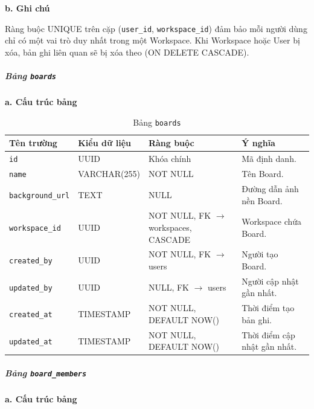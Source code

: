 \hspace{1.5em}\textbf{b. Ghi chú}

Ràng buộc UNIQUE trên cặp (\texttt{user\_id}, \texttt{workspace\_id}) đảm bảo mỗi người dùng chỉ có một vai trò duy nhất trong một Workspace. Khi Workspace hoặc User bị xóa, bản ghi liên quan sẽ bị xóa theo (ON DELETE CASCADE).


\subparagraph{Bảng \texttt{boards}} \mbox{}

\hspace{1.5em}\textbf{a. Cấu trúc bảng}

\begin{table}[H]
\centering
\begin{tabular}{|p{3cm}|p{3.5cm}|p{3.5cm}|p{4cm}|}
\hline
\textbf{Tên trường} & \textbf{Kiểu dữ liệu} & \textbf{Ràng buộc} & \textbf{Ý nghĩa} \\
\hline
\texttt{id} & UUID & Khóa chính & Mã định danh. \\
\hline
\texttt{name} & VARCHAR(255) & NOT NULL & Tên Board. \\
\hline
\texttt{background\_url} & TEXT & NULL & Đường dẫn ảnh nền Board. \\
\hline
\texttt{workspace\_id} & UUID & NOT NULL, FK $\rightarrow$ workspaces, CASCADE & Workspace chứa Board. \\
\hline
\texttt{created\_by} & UUID & NOT NULL, FK $\rightarrow$ users & Người tạo Board. \\
\hline
\texttt{updated\_by} & UUID & NULL, FK $\rightarrow$ users & Người cập nhật gần nhất. \\
\hline
\texttt{created\_at} & TIMESTAMP & NOT NULL, DEFAULT NOW() & Thời điểm tạo bản ghi. \\
\hline
\texttt{updated\_at} & TIMESTAMP & NOT NULL, DEFAULT NOW() & Thời điểm cập nhật gần nhất. \\
\hline
\end{tabular}
\caption{Bảng \texttt{boards}}
\label{tab:db_boards}
\end{table}


\subparagraph{Bảng \texttt{board\_members}} \mbox{}

\hspace{1.5em}\textbf{a. Cấu trúc bảng}

